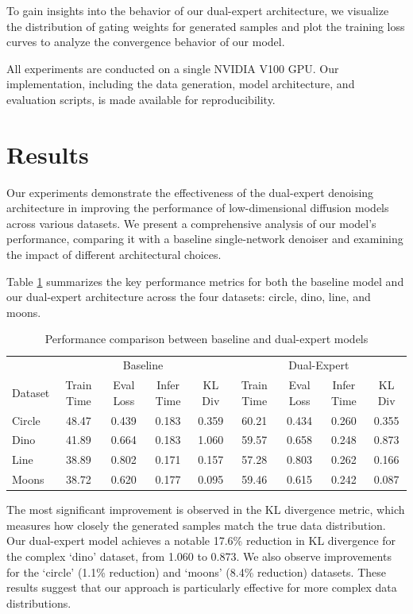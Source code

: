 \documentclass{article} %
\begin{document}
To gain insights into the behavior of our dual-expert architecture, we visualize the distribution of gating weights for generated samples and plot the training loss curves to analyze the convergence behavior of our model.

All experiments are conducted on a single NVIDIA V100 GPU. Our implementation, including the data generation, model architecture, and evaluation scripts, is made available for reproducibility.

\section{Results}
\label{sec:results}

Our experiments demonstrate the effectiveness of the dual-expert denoising architecture in improving the performance of low-dimensional diffusion models across various datasets. We present a comprehensive analysis of our model's performance, comparing it with a baseline single-network denoiser and examining the impact of different architectural choices.

Table \ref{tab:performance_comparison} summarizes the key performance metrics for both the baseline model and our dual-expert architecture across the four datasets: circle, dino, line, and moons.

\begin{table}[h]
\centering
\caption{Performance comparison between baseline and dual-expert models}
\label{tab:performance_comparison}
\begin{tabular}{lcccccccc}
\toprule
& \multicolumn{4}{c}{Baseline} & \multicolumn{4}{c}{Dual-Expert} \\
\cmidrule(lr){2-5} \cmidrule(lr){6-9}
Dataset & Train Time & Eval Loss & Infer Time & KL Div & Train Time & Eval Loss & Infer Time & KL Div \\
\midrule
Circle & 48.47 & 0.439 & 0.183 & 0.359 & 60.21 & 0.434 & 0.260 & 0.355 \\
Dino & 41.89 & 0.664 & 0.183 & 1.060 & 59.57 & 0.658 & 0.248 & 0.873 \\
Line & 38.89 & 0.802 & 0.171 & 0.157 & 57.28 & 0.803 & 0.262 & 0.166 \\
Moons & 38.72 & 0.620 & 0.177 & 0.095 & 59.46 & 0.615 & 0.242 & 0.087 \\
\bottomrule
\end{tabular}
\end{table}

The most significant improvement is observed in the KL divergence metric, which measures how closely the generated samples match the true data distribution. Our dual-expert model achieves a notable 17.6\% reduction in KL divergence for the complex `dino' dataset, from 1.060 to 0.873. We also observe improvements for the `circle' (1.1\% reduction) and `moons' (8.4\% reduction) datasets. These results suggest that our approach is particularly effective for more complex data distributions.
\end{document}

